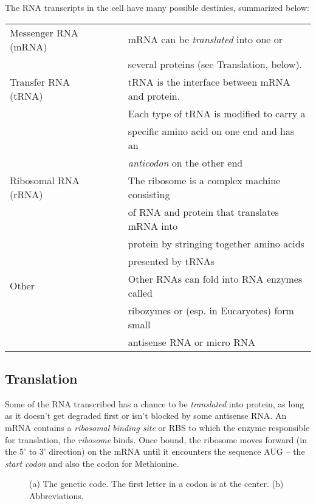 The RNA transcripts in the cell have many possible destinies,
summarized below:

\smallskip

\begin{tabular}{lll}
Messenger RNA (mRNA) & \ & mRNA can be {\em translated} into one or \\
                     & \ & several proteins (see Translation, below).  \\
Transfer RNA (tRNA)  & \ & tRNA is the interface between mRNA and protein.  \\
                     & \ & Each type of tRNA is modified to carry a \\
                     & \ & specific amino acid on one end and has an \\
                     & \ & {\em anticodon} on the other end \\ 
Ribosomal RNA (rRNA) & \ & The ribosome is a complex machine consisting \\
                     & \ & of RNA and protein that translates mRNA into \\
                     & \ & protein by stringing together amino acids \\
                     & \ & presented by tRNAs \\
Other                & \ & Other RNAs can fold into RNA enzymes called \\
                     & \ & ribozymes or (esp. in Eucaryotes) form small \\
                     & \ & antisense RNA or micro RNA      
\end{tabular}

\subsection{Translation}

Some of the RNA transcribed has a chance to be {\em translated} into
protein, as long as it doesn't get degraded first or isn't blocked by
some antisense RNA. An mRNA contains a {\em ribosomal binding site} or
RBS to which the enzyme responsible for translation, the {\em ribosome}
binds. Once bound, the ribosome moves forward (in the 5' to 3'
direction) on the mRNA until it encounters the sequence AUG -- the
{\em start codon} and also the codon for Methionine. 

\begin{figure}
\centering
{}
\caption{\label{fig:genetic-code}
(a) The genetic code. The first letter in a codon is at the center. (b) Abbreviations. 
}
\end{figure}

